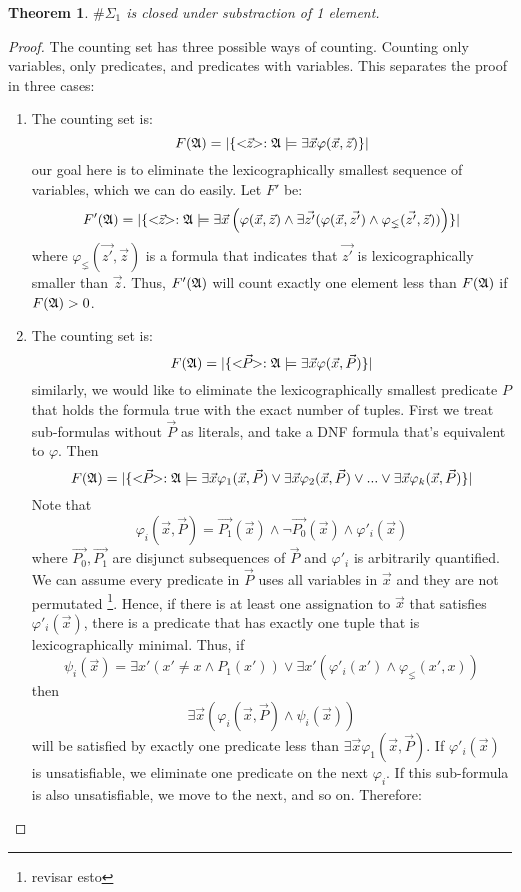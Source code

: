 \documentclass[12pt]{article}
\def\A{{\frak A}}
\newtheorem{theo}{Theorem}
\begin{document}
\begin{theo}
$\#\Sigma_1$ is closed under substraction of 1 element.
\end{theo}
\begin{proof}
The counting set has three possible ways of counting. Counting only variables, only predicates, and predicates with variables. This separates the proof in three cases:
\begin{enumerate}
\item The counting set is:
$$
F(\A) = \vert \{ <\!\!\vec{z}\!\!> :\A \models \exists \vec{x} \varphi(\vec{x},\vec{z}) \} \vert
$$
our goal here is to eliminate the lexicographically smallest sequence of variables, which we can do easily. Let $F'$ be:
$$
F'(\A) = \vert \{ <\!\!\vec{z}\!\!> :\A \models \exists \vec{x}\left( \varphi(\vec{x},\vec{z}) \wedge \exists \vec{z'} (\varphi(\vec{x},\vec{z'}) \wedge \varphi_{\lneq}(\vec{z'},\vec{z} ) ) \right) \} \vert
$$
where $\varphi_{\lneq}(\vec{z'},\vec{z})$ is a formula that indicates that $\vec{z'}$ is lexicographically smaller than $\vec{z}$. Thus, $F'(\A)$ will count exactly one element less than $F(\A)$ if $F(\A)>0$.
\item The counting set is:
$$
F(\A) = \vert \{ <\!\!\vec{P}\!\!> :\A \models \exists \vec{x} \varphi(\vec{x},\vec{P}) \} \vert
$$
similarly, we would like to eliminate the lexicographically smallest predicate $P$ that holds the formula true with the exact number of tuples. First we treat sub-formulas without $\vec{P}$ as literals, and take a DNF formula that's equivalent to $\varphi$. Then
$$
F(\A) = \vert \{ <\!\!\vec{P}\!\!> :\A \models 
\exists \vec{x} \varphi_1(\vec{x},\vec{P}) \vee
\exists \vec{x} \varphi_2(\vec{x},\vec{P}) \vee
... \vee
\exists \vec{x} \varphi_k(\vec{x},\vec{P})
 \} \vert
$$
Note that
$$
\varphi_i(\vec{x},\vec{P}) = \vec{P_1}(\vec{x}) \wedge \neg \vec{P_0}(\vec{x}) \wedge \varphi'_i(\vec{x})
$$
where $\vec{P_0},\vec{P_1}$ are disjunct subsequences of $\vec{P}$ and $\varphi'_i$ is arbitrarily quantified. We can assume every predicate in $\vec{P}$ uses all variables in $\vec{x}$ and they are not permutated \footnote[1]{revisar esto}. Hence, if there is at least one assignation to $\vec{x}$ that satisfies $\varphi'_i(\vec{x})$, there is a predicate that has exactly one tuple that is lexicographically minimal. Thus, if
$$
\psi_i(\vec{x}) = \exists x' (x' \neq x \wedge P_1(x')) \vee \exists x' (\varphi'_i(x') \wedge \varphi_{\lneq}(x',x))
$$
then 
$$
\exists \vec{x} \left( \varphi_i(\vec{x},\vec{P}) \wedge \psi_i(\vec{x}) \right)
$$
will be satisfied by exactly one predicate less than $\exists \vec{x} \varphi_1(\vec{x},\vec{P})$. If $\varphi'_i(\vec{x})$ is unsatisfiable, we eliminate one predicate on the next $\varphi_i$. If this sub-formula is also unsatisfiable, we move to the next, and so on. Therefore:

\end{enumerate}
\end{proof}
\end{document}
